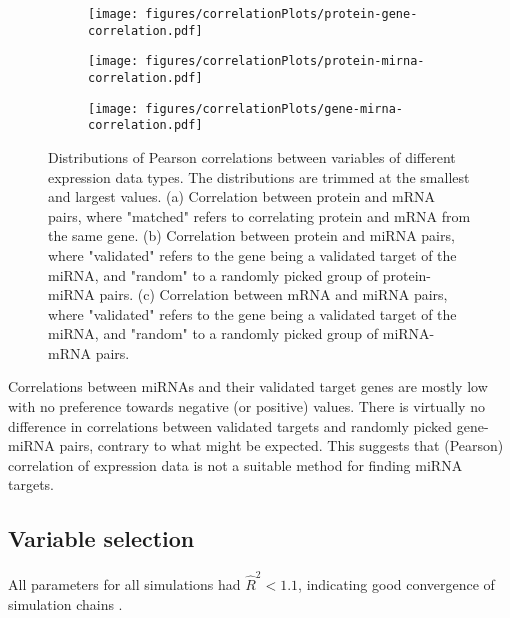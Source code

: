 \begin{figure}[!h]
  \centering
  \begin{subfigure}{.45\textwidth}
    \centering
    \texttt{[image: figures/correlationPlots/protein-gene-correlation.pdf]}
    \subcaption{ \label{fig:protein-gene-cor}}
  \end{subfigure}
  \begin{subfigure}{.45\textwidth}
    \centering
    \texttt{[image: figures/correlationPlots/protein-mirna-correlation.pdf]}
    \subcaption{ \label{fig:protein-mirna-cor}}
  \end{subfigure}
  \begin{subfigure}{.45\textwidth}
    \texttt{[image: figures/correlationPlots/gene-mirna-correlation.pdf]}
    \subcaption{ \label{fig:gene-mirna-cor}}
  \end{subfigure}

  \caption{Distributions of Pearson correlations between variables of different expression data types.
  The distributions are trimmed at the smallest and largest values.
  (a) Correlation between protein and mRNA pairs, where "matched" refers to correlating
  protein and mRNA from the same gene. (b) Correlation between protein and miRNA pairs,
  where "validated" refers to the gene being a validated target of the miRNA, and
  "random" to a randomly picked group of protein-miRNA pairs.
  (c) Correlation between mRNA and miRNA pairs,
  where "validated" refers to the gene being a validated target of the miRNA, and
  "random" to a randomly picked group of miRNA-mRNA pairs.}
  \label{fig:correlations}
\end{figure}

Correlations between miRNAs and their validated target genes are mostly low
with no preference towards negative (or positive) values. There is virtually
no difference in correlations between validated targets and randomly picked
gene-miRNA pairs, contrary to what might be expected. This suggests that
(Pearson) correlation of expression data is not a suitable method for finding
miRNA targets.


\subsection{Variable selection}

All parameters for all simulations had $\hat{R}^2 < 1.1$, indicating
good convergence of simulation chains \citep{Gelman2013}.

